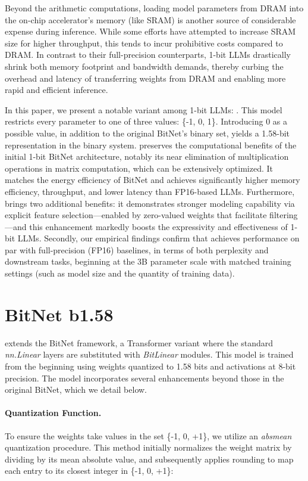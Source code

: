 Beyond the arithmetic computations, loading model parameters from DRAM into the on-chip accelerator's memory (like SRAM) is another source of considerable expense during inference. While some efforts have attempted to increase SRAM size for higher throughput, this tends to incur prohibitive costs compared to DRAM. In contrast to their full-precision counterparts, 1-bit LLMs drastically shrink both memory footprint and bandwidth demands, thereby curbing the overhead and latency of transferring weights from DRAM and enabling more rapid and efficient inference.

In this paper, we present a notable variant among 1-bit LLMs: \textbf{}. This model restricts every parameter to one of three values: \{-1, 0, 1\}. Introducing 0 as a possible value, in addition to the original BitNet’s binary set, yields a 1.58-bit representation in the binary system.  preserves the computational benefits of the initial 1-bit BitNet architecture, notably its near elimination of multiplication operations in matrix computation, which can be extensively optimized. It matches the energy efficiency of BitNet and achieves significantly higher memory efficiency, throughput, and lower latency than FP16-based LLMs. Furthermore,  brings two additional benefits: it demonstrates stronger modeling capability via explicit feature selection—enabled by zero-valued weights that facilitate filtering—and this enhancement markedly boosts the expressivity and effectiveness of 1-bit LLMs. Secondly, our empirical findings confirm that  achieves performance on par with full-precision (FP16) baselines, in terms of both perplexity and downstream tasks, beginning at the 3B parameter scale with matched training settings (such as model size and the quantity of training data).

\section{BitNet b1.58}

 extends the BitNet framework, a Transformer variant where the standard \emph{nn.Linear} layers are substituted with \emph{BitLinear} modules. This model is trained from the beginning using weights quantized to 1.58 bits and activations at 8-bit precision. The model incorporates several enhancements beyond those in the original BitNet, which we detail below.

\paragraph{Quantization Function.} To ensure the weights take values in the set \{-1, 0, +1\}, we utilize an \emph{absmean} quantization procedure. This method initially normalizes the weight matrix by dividing by its mean absolute value, and subsequently applies rounding to map each entry to its closest integer in \{-1, 0, +1\}:

